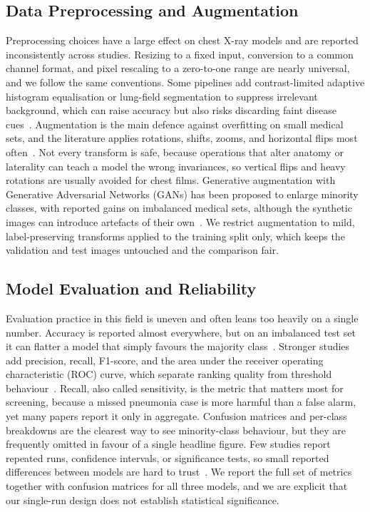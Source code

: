 \documentclass[preprint,12pt]{elsarticle}
\begin{document}
\subsection{Data Preprocessing and Augmentation}
Preprocessing choices have a large effect on chest X-ray models and are reported inconsistently across studies.
Resizing to a fixed input, conversion to a common channel format, and pixel rescaling to a zero-to-one range are nearly universal, and we follow the same conventions.
Some pipelines add contrast-limited adaptive histogram equalisation or lung-field segmentation to suppress irrelevant background, which can raise accuracy but also risks discarding faint disease cues~\cite{nillmani2022segmentation,rahman2020transfer}.
Augmentation is the main defence against overfitting on small medical sets, and the literature applies rotations, shifts, zooms, and horizontal flips most often~\cite{wu2022dataaugmentation}.
Not every transform is safe, because operations that alter anatomy or laterality can teach a model the wrong invariances, so vertical flips and heavy rotations are usually avoided for chest films.
Generative augmentation with Generative Adversarial Networks (GANs) has been proposed to enlarge minority classes, with reported gains on imbalanced medical sets, although the synthetic images can introduce artefacts of their own~\cite{ding2025improving,zhang2026doublesgan,wubineh2026viral}.
We restrict augmentation to mild, label-preserving transforms applied to the training split only, which keeps the validation and test images untouched and the comparison fair.

\subsection{Model Evaluation and Reliability}
Evaluation practice in this field is uneven and often leans too heavily on a single number.
Accuracy is reported almost everywhere, but on an imbalanced test set it can flatter a model that simply favours the majority class~\cite{guleria2024systematic}.
Stronger studies add precision, recall, F1-score, and the area under the receiver operating characteristic (ROC) curve, which separate ranking quality from threshold behaviour~\cite{kundu2021pneumonia}.
Recall, also called sensitivity, is the metric that matters most for screening, because a missed pneumonia case is more harmful than a false alarm, yet many papers report it only in aggregate.
Confusion matrices and per-class breakdowns are the clearest way to see minority-class behaviour, but they are frequently omitted in favour of a single headline figure.
Few studies report repeated runs, confidence intervals, or significance tests, so small reported differences between models are hard to trust~\cite{aitnasser2023review}.
We report the full set of metrics together with confusion matrices for all three models, and we are explicit that our single-run design does not establish statistical significance.
\end{document}
